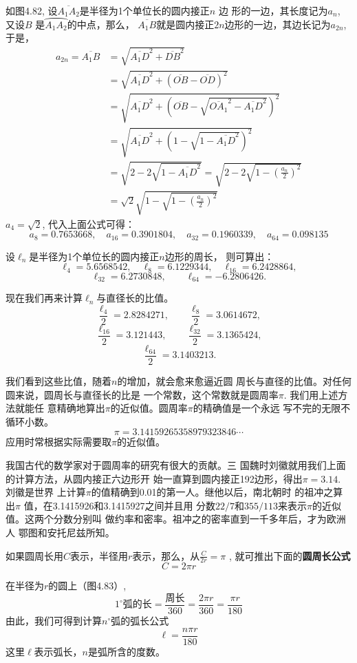 如图4.82, 设$\overline{A_1A_2}$是半径为1个单位长的圆内接正$n$
边
形的一边，其长度记为$a_n$, 又设$B$
是$\wideparen{A_1A_2}$的中点，那么，
$\overline{A_1B}$就是圆内接正$2n$边形的一边，其边长记为$a_{2n}$, 于是，
\[\begin{split}
a_{2n}=\overline{A_1B}&=\sqrt{\overline{A_1D}^2+\overline{DB}^2}\\
&=\sqrt{\overline{A_1D}^2+\left(\overline{OB}-\overline{OD}\right)^2}\\
&=\sqrt{\overline{A_1D}^2+\left(\overline{OB}-\sqrt{\overline{OA_1}^2-\overline{A_1D}^2}\right)^2}\\
&=\sqrt{\overline{A_1D}^2+\left(1-\sqrt{1-\overline{A_1D}^2}\right)^2}\\
&=\sqrt{2-2\sqrt{1-\overline{A_1D}^2}}=\sqrt{2-2\sqrt{1-\left(\frac{a_n}{2}\right)^2}}\\
&=\sqrt{2}\sqrt{1-\sqrt{1-\left(\frac{a_n}{2}\right)^2}}
\end{split}\]
$a_4=\sqrt{2}$, 代入上面公式可得：
\[a_8=0.7653668,\quad a_{16}=0.3901804,\quad
a_{32}=0.1960339,\quad a_{64}=0.098135\]

设$\ell_n$是半径为1个单位长的圆内接正$n$边形的周长，
则可算出：
\[\ell_4=5.6568542,\quad \ell_8=6.1229344,\quad 
\ell_{16}=6.2428864,\]
\[\ell_{32}=6.2730848,\qquad \ell_{64}=-6.2806426.\]

现在我们再来计算$\ell_n$与直径长的比值。
\[\frac{\ell_4}{2}=2.8284271,\qquad \frac{\ell_8}{2}=3.0614672,\]
\[\frac{\ell_{16}}{2}=3.121443,\qquad \frac{\ell_{32}}{2}=3.1365424,\]
\[\frac{\ell_{64}}{2}=3.1403213.\]

我们看到这些比值，随着$n$的增加，就会愈来愈逼近圆
周长与直径的比值。对任何圆来说，圆周长与直径长的比是
一个常数，这个常数就是圆周率$\pi$. 我们用上述方法就能任
意精确地算出$\pi$的近似值。圆周率$\pi$的精确值是一个永远
写不完的无限不循环小数。
\[\pi=3.14159265358979323846\cdots\]
应用时常根据实际需要取$\pi$的近似值。

我国古代的数学家对于圆周率的研究有很大的贡献。三
国魏时刘徽就用我们上面的计算方法，从圆内接正六边形开
始一直算到圆内接正192边形，得出$\pi=3.14$. 刘徽是世界
上计算$\pi$的值精确到0.01的第一人。继他以后，南北朝时
的祖冲之算出$\pi$
值，在3.1415926和3.1415927之间并且用
分数$22/7$和$355/113$来表示$\pi$的近似值。这两个分数分别叫
做约率和密率。祖冲之的密率直到一千多年后，才为欧洲人
鄂图和安托尼兹所知。

如果圆周长用$C$表示，半径用$r$表示，那么，从$\frac{C}{2r}=\pi$
, 就可推出下面的\textbf{圆周长公式}
\[C=2\pi r\]

在半径为$r$的圆上（图4.83）,
\[1^{\circ}\text{弧的长}=\frac{\text{周长}}{360}=\frac{2\pi r}{360}=\frac{\pi r}{180}\]
由此，我们可得到计算$n^{\circ}$弧的弧长公式
\[\ell=\frac{n\pi r}{180}\]
这里$\ell$表示弧长，$n$是弧所含的度数。

